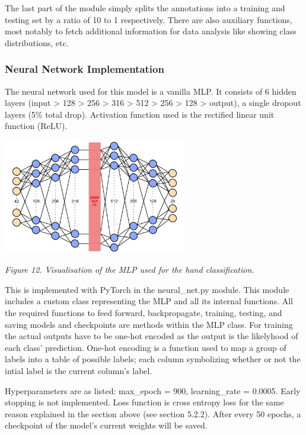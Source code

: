 \documentclass[11pt]{article}
\begin{document}
    The last part of the module simply splits the annotations into a training and testing set by a ratio of 10 to 1 respectively. There are also auxiliary functions, most notably to fetch additional information for data analysis like showing class distributions, etc.

        \subsubsection{Neural Network Implementation}
    The neural network used for this model is a vanilla MLP. It consists of 6 hidden layers (input > 128 > 256 > 316 > 512 > 256 > 128 > output), a single dropout layers (5\% total drop). Activation function used is the rectified linear unit function (ReLU). 

    \begin{center}
        \includegraphics[width=8cm]{images/mlp.png}
        \\
        \raggedright \textit{
        Figure 12. Visualisation of the MLP used for the hand classification.
        }
    \end{center}

    This is implemented with PyTorch in the neural\_net.py module. This module includes a custom class representing the MLP and all its internal functions. All the required functions to feed forward, backpropagate, training, testing, and saving models and checkpoints are methods within the MLP class. For training the actual outputs have to be one-hot encoded as the output is the likelyhood of each class' prediction. One-hot encoding is a function used to map a group of labels into a table of possible labels; each column symbolizing whether or not the intial label is the current column's label. 

    Hyperparameters are as listed: max\_epoch = 900, learning\_rate = 0.0005. Early stopping is not implemented. Loss function is cross entropy loss for the same reason explained in the section above (see section 5.2.2). After every 50 epochs, a checkpoint of the model's current weights will be saved. 
\end{document}
